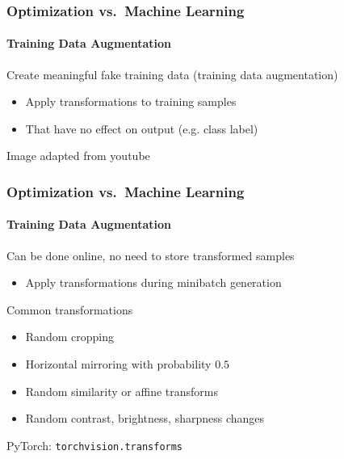 \documentclass[xetex,professionalfont]{beamer}
\renewcommand\emph[1]{\textcolor{tuwcvl_cvl_blue}{#1}}
\newcommand{\eg}{\mbox{e.g.}\xspace} %
\begin{document}
  
  \begin{frame}
    \frametitle{Optimization vs.~Machine Learning}
    \framesubtitle{Training Data Augmentation}
  
  Create meaningful fake training data (\emph{training data augmentation})
  \begin{itemize}
      \item Apply transformations to training samples
      \item That have no effect on output (\eg class label)
  \end{itemize}
  
  \bigskip
  
  \begin{center}
      {\centering Image adapted from youtube}
  \end{center}
  
  \end{frame}
  
  
  \begin{frame}
    \frametitle{Optimization vs.~Machine Learning}
    \framesubtitle{Training Data Augmentation}
  
  Can be done online, no need to store transformed samples
  \begin{itemize}
      \item Apply transformations during minibatch generation
  \end{itemize}
  
  \bigskip
  
  Common transformations
  \begin{itemize}
      \item Random cropping
      \item Horizontal mirroring with probability $0.5$
      \item Random similarity or affine transforms
      \item Random contrast, brightness, sharpness changes
  \end{itemize}
  
  \bigskip
  
  PyTorch: \texttt{torchvision.transforms}
  
  \end{frame}
  
\end{document}
